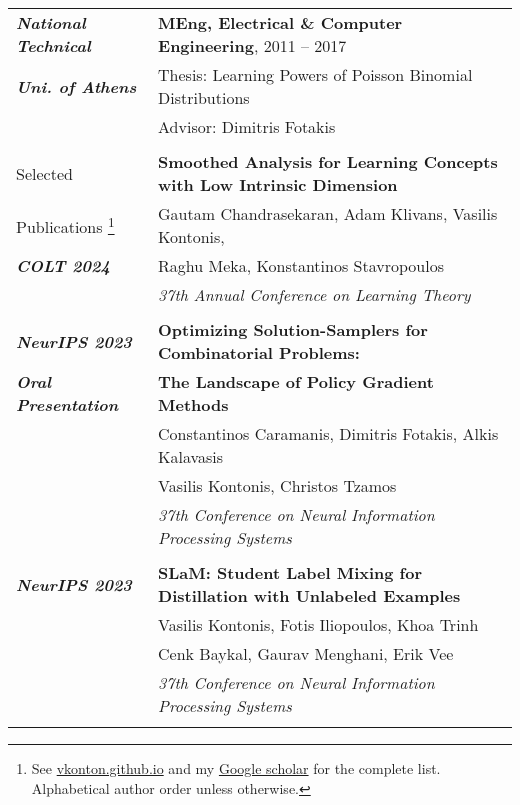 \documentclass[letterpaper,11pt,oneside]{article}
\begin{document}
\begin{longtable}{@{} l l}
      \emph{\textbf{National Technical}}
     & \textbf{MEng, Electrical \& Computer Engineering}, 2011 -- 2017\\
     \emph{\textbf{Uni. of Athens} }
     & Thesis: Learning Powers of Poisson Binomial Distributions\\
     & Advisor: Dimitris Fotakis \\
     & \\


 \Large{Selected}  
 &\textbf{Smoothed Analysis for Learning Concepts with
 Low Intrinsic Dimension} \\
\Large{Publications \footnote{ 
See \href{https://vkonton.github.io}{vkonton.github.io} and
my \href{https://scholar.google.com/citations?user=7_44KWAAAAAJ&hl=el}{Google scholar} 
for the complete list.  
Alphabetical author order unless otherwise.
}}
 & Gautam Chandrasekaran, Adam Klivans, Vasilis Kontonis, \\
  \emph{\textbf{COLT 2024}}
 & Raghu Meka, Konstantinos Stavropoulos \\
 & \emph{37th Annual Conference on Learning Theory} \\
 & \\

  \emph{\textbf{NeurIPS 2023}}
 &\textbf{Optimizing Solution-Samplers for Combinatorial Problems:}\\
  \emph{\textbf{Oral Presentation}} 
 &\textbf{The Landscape of Policy Gradient Methods}\\
 & Constantinos Caramanis, Dimitris Fotakis, Alkis Kalavasis\\
 & Vasilis Kontonis, Christos Tzamos\\
 & \emph{37th Conference on Neural Information Processing Systems} \\
 & \\

 \emph{\textbf{NeurIPS 2023}}
 &\textbf{SLaM: Student Label Mixing for Distillation with Unlabeled Examples} \\
 & Vasilis Kontonis, Fotis Iliopoulos, Khoa Trinh \\
 & Cenk Baykal, Gaurav Menghani, Erik Vee\\ 
 & \emph{37th Conference on Neural Information Processing Systems} \\
 & \\



\end{longtable}
\end{document}
